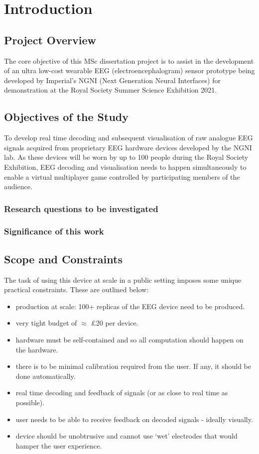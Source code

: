 \chapter{Introduction}

\graphicspath{ {report/Chapter1/assets/} } 

\section{Project Overview}

The core objective of this MSc dissertation project is to assist in the development of an ultra low-cost wearable EEG (electroencephalogram) sensor prototype being developed by Imperial's NGNI (Next Generation Neural Interfaces) for demonstration at the Royal Society Summer Science Exhibition 2021. 

\section{Objectives of the Study}
To develop real time decoding and subsequent visualisation of raw analogue EEG signals acquired from proprietary EEG hardware devices developed by the NGNI lab. As these devices will be worn by up to 100 people during the Royal Society Exhibition, EEG decoding and visualisation needs to happen simultaneously to enable a virtual multiplayer game controlled by participating members of the audience.

\subsection{Research questions to be investigated}

\subsection{Significance of this work}

\section{Scope and Constraints}
The task of using this device at scale in a public setting imposes some unique practical constraints. These are outlined below:
\begin{itemize}
    \item production at scale: 100+ replicas of the EEG device need to be produced.
    \item very tight budget of $\approx$ £20 per device.
    \item hardware must be self-contained and so all computation should happen on the hardware. 
    \item there is to be minimal calibration required from the user. If any, it should be done automatically.
    \item real time decoding and feedback of signals (or as close to real time as possible).
    \item user needs to be able to receive feedback on decoded signals - ideally visually.
    \item device should be unobtrusive and cannot use `wet' electrodes that would hamper the user experience.
\end{itemize}

